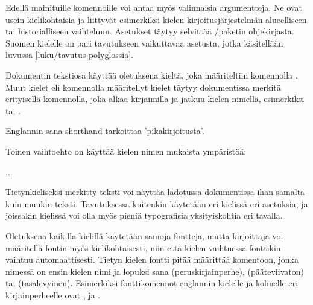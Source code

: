 \begin{koodilohkosis}
\setdefaultlanguage{finnish}  %
\end{koodilohkosis}

\noindent
Edellä mainituille komennoille voi antaa myös valinnaisia argumentteja.
Ne ovat usein kielikohtaisia ja liittyvät esimerkiksi kielen
kirjoitusjärjestelmän alueelliseen tai historialliseen vaihteluun.
Asetukset täytyy selvittää \-/paketin ohjekirjasta.
Suomen kielelle on pari tavutukseen vaikuttavaa asetusta, jotka
käsitellään luvussa \ref{luku/tavutus-polyglossia}.

Dokumentin tekstiosa käyttää oletuksena kieltä, joka määriteltiin
komennolla . Muut kielet eli komennolla
 määritellyt kielet täytyy dokumentissa
merkitä erityisellä komennolla, joka alkaa kirjaimilla 
ja jatkuu kielen nimellä, esimerkiksi  tai
.

\begin{koodilohkosis}
Englannin sana \textenglish{shorthand} tarkoittaa 'pikakirjoitusta'.
\end{koodilohkosis}

\noindent
Toinen vaihtoehto on käyttää kielen nimen mukaista ympäristöä:

\begin{koodilohkosis}
\begin{greek}
  ...
\end{greek}
\end{koodilohkosis}

\noindent
Tietynkieliseksi merkitty teksti voi näyttää ladotussa dokumentissa ihan
samalta kuin muukin teksti. Tavutuksessa kuitenkin käytetään eri
kielissä eri asetuksia, ja joissakin kielissä voi olla myös pieniä
typografisia yksityiskohtia eri tavalla.

Oletuksena kaikilla kielillä käytetään samoja fontteja, mutta
kirjoittaja voi määritellä fontin myös kielikohtaisesti, niin että
kielen vaihtuessa fonttikin vaihtuu automaattisesti. Tietyn kielen
fontti pitää määrittää komentoon, jonka nimessä on ensin kielen nimi ja
lopuksi sana  (peruskirjainperhe), 
(pääteviivaton) tai  (tasalevyinen). Esimerkiksi
fonttikomennot englannin kielelle ja kolmelle eri kirjainperheelle ovat
,  ja
.

